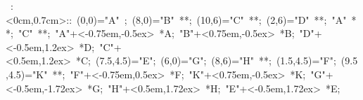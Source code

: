 \hbox{
\xy    <1cm,0cm>:<0cm,0.7cm>::
       (0,0)="A" ; (8,0)="B" **\dir{-}; 
       (10,6)="C" **\dir{-}; (2,6)="D" **\dir{-}; 
       "A" **\dir{-}; "C" **\dir{-}; 
       "A"+<-0.75em,-0.5ex> *{A};
       "B"+<0.75em,-0.5ex> *{B};
       "D"+<-0.5em,1.2ex> *{D};
       "C"+<0.5em,1.2ex> *{C};
       (7.5,4.5)="E"; (6,0)="G"; (8,6)="H" **\dir{-};
       (1.5,4.5)="F"; (9.5,4.5)="K" **\dir{-};
       "F"+<-0.75em,0.5ex> *{F};
       "K"+<0.75em,-0.5ex> *{K};
       "G"+<-0.5em,-1.72ex> *{G};
       "H"+<0.5em,1.72ex> *{H};
       "E"+<-0.5em,1.72ex> *{E};
       \endxy}
	 
